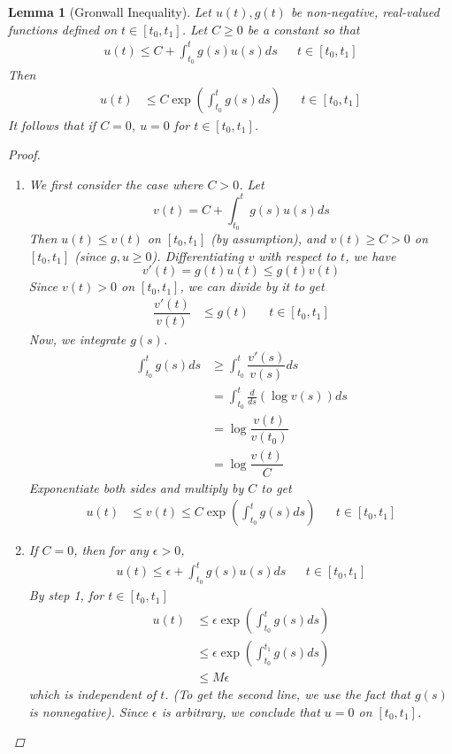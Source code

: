 \documentclass[10pt]{article}         %
\newtheorem{lemma}{Lemma}[section]
\theoremstyle{remark}
\begin{document}
\begin{lemma}[Gronwall Inequality]
Let $u(t), g(t)$ be non-negative, real-valued functions defined on $t \in [t_0, t_1]$. Let $C \geq 0$ be a constant so that
\begin{align*}
u(t) \leq C + \int_{t_0}^t g(s) u(s) ds && t \in [t_0, t_1]
\end{align*}
Then
\begin{align*}
u(t) &\leq C \exp \left( \int_{t_0}^t g(s) ds \right) && t \in [t_0, t_1]
\end{align*}
It follows that if $C = 0$, $u = 0$ for $t \in [t_0, t_1]$.
\begin{proof}
\begin{enumerate}
\item We first consider the case where $C > 0$. Let
\[
v(t) = C + \int_{t_0}^t g(s) u(s) ds
\]
Then $u(t) \leq v(t)$ on $[t_0, t_1]$ (by assumption), and $v(t) \geq C > 0$ on $[t_0, t_1]$ (since $g, u \geq 0$). Differentiating $v$ with respect to $t$, we have
\[
v'(t) = g(t) u(t) \leq g(t)v(t)
\] 
Since $v(t) > 0$ on $[t_0, t_1]$, we can divide by it to get
\begin{align*}
\dfrac{v'(t)}{v(t)} &\leq g(t) && t \in [t_0, t_1]
\end{align*}
Now, we integrate $g(s)$.
\begin{align*}
\int_{t_0}^t g(s) ds &\geq \int_{t_0}^t \dfrac{v'(s)}{v(s)} ds \\
&= \int_{t_0}^t \frac{d}{ds}\left( \log {v(s)} \right) ds \\
&= \log\dfrac{v(t)}{v(t_0)}\\
&= \log\dfrac{v(t)}{C}
\end{align*}
Exponentiate both sides and multiply by $C$ to get
\begin{align*}
u(t) &\leq v(t) \leq C \exp \left( \int_{t_0}^t g(s) ds \right) && t \in [t_0, t_1]
\end{align*}
\item If $C = 0$, then for any $\epsilon > 0$,
\begin{align*}
u(t) \leq \epsilon + \int_{t_0}^t g(s) u(s) ds && t \in [t_0, t_1]
\end{align*}
By step 1, for $t \in [t_0, t_1]$ 
\begin{align*}
u(t) &\leq \epsilon \exp \left( \int_{t_0}^t g(s) ds \right) \\&\leq \epsilon \exp \left( \int_{t_0}^{t_1} g(s) ds \right) \\
&\leq M \epsilon
\end{align*}
which is independent of $t$. (To get the second line, we use the fact that $g(s)$ is nonnegative). Since $\epsilon$ is arbitrary, we conclude that $u = 0$ on $[t_0, t_1]$.
\end{enumerate}
\end{proof}
\end{lemma}
\end{document}
